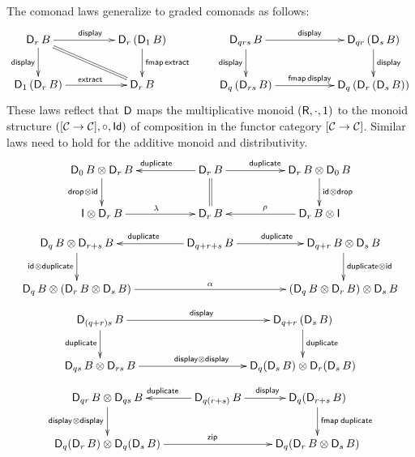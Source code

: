 \documentclass[acmsmall,review,anonymous]{acmart}\settopmatter{printfolios=true,printccs=false,printacmref=false}
\begin{document}
The comonad laws generalize to graded comonads as follows:
\[
\xymatrix@C=10ex{
\D[r]\,B  \ar[d]_{\tdisplay} \ar[r]^{\tdisplay} \ar@{=}[dr]
  & \D[r]\,(\D[1]\,B)  \ar[d]^{\tfmap\,\textract}
\\
\D[1]\,(\D[r]\,B) \ar[r]^{\textract}
  & \D[r]\,B
}
\qquad
\xymatrix@C=12ex{
\D[qrs]\,B \ar[d]_{\tdisplay} \ar[r]^{\tdisplay}
  & \D[qr]\,(\D[s]\,B) \ar[d]^{\tdisplay}
\\
\D[q]\,(\D[rs]\,B) \ar[r]^{\tfmap\,\tdisplay}
  & \D[q]\,(\D[r]\,(\D[s]\,B))
}
\]
These laws reflect that $\mathsf{D}_{}$ maps the multiplicative monoid
$(\mathsf{R},{\cdot},1)$ to the monoid structure $([\mathcal{C} \to \mathcal{C}],{\circ},\mathsf{Id})$
of composition in the functor category $[\mathcal{C} \to \mathcal{C}]$.  Similar laws
need to hold for the additive monoid and distributivity.
\[
\xymatrix@C=12ex{
\D[0]\,B \otimes \D[r]\,B \ar[d]_{\tdrop \otimes \tid}
& \D[r]\,B \ar[l]_{\tduplicate} \ar[r]^{\tduplicate} \ar@{=}[d]
& \D[r]\,B \otimes \D[0]\,B \ar[d]^{\tid \otimes \tdrop}
\\
\I \otimes \D[r]\,B \ar[r]^{\Gl}
& \D[r]\,B
& \D[r]\,B \otimes \I \ar[l]_{\Gr}
}
\]
\[
\xymatrix@C=10ex{
\D[q]\,B \otimes \D[r+s]\,B  \ar[d]_{\tid \otimes \tduplicate}
& \D[q+r+s]\,B \ar[l]_{\tduplicate} \ar[r]^{\tduplicate}
& \D[q+r]\,B \otimes \D[s]\,B \ar[d]^{\tduplicate \otimes \tid}
\\
\D[q]\,B \otimes (\D[r]\,B \otimes \D[s]\,B) \ar[rr]^{\Ga}
& & (\D[q]\,B \otimes \D[r]\,B) \otimes \D[s]\,B
}
\]
\[
\xymatrix@C=22ex{
\D[(q+r)s]\,B \ar[r]^{\tdisplay} \ar[d]_{\tduplicate}
& \D[q+r]\,(\D[s]\,B) \ar[d]^{\tduplicate}
\\
\D[qs]\,B \otimes \D[rs]\,B \ar[r]^{\tdisplay \otimes \tdisplay}
& \D[q](\D[s]\,B) \otimes \D[r](\D[s]\,B)
}
\]
\[
\xymatrix{
\D[qr]\,B \otimes \D[qs]\,B \ar[d]_{\display \otimes \display}
  & \D[q(r+s)]\,B \ar[l]_{\tduplicate} \ar[r]^{\display}
  & \D[q](\D[r+s]\,B) \ar[d]^{\fmap\tduplicate}
\\
\D[q](\D[r]\,B) \otimes \D[q](\D[s]\,B) \ar[rr]^{\tzip}
&&
\D[q](\D[r]\,B \otimes \D[s]\,B)
}
\]
\end{document}
